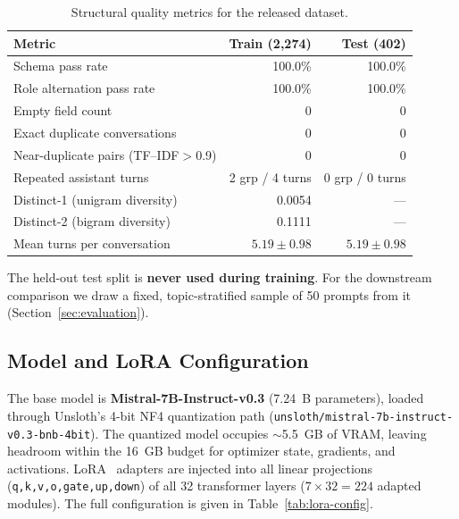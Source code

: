 \documentclass[11pt, a4paper]{article}
\begin{document}
\begin{table}[H]
\centering
\caption{Structural quality metrics for the released dataset.}
\label{tab:dataset-quality}
\begin{tabular}{lrr}
\hline
\textbf{Metric} & \textbf{Train (2{,}274)} & \textbf{Test (402)} \\
\hline
Schema pass rate                     & 100.0\% & 100.0\% \\
Role alternation pass rate           & 100.0\% & 100.0\% \\
Empty field count                    & 0       & 0       \\
Exact duplicate conversations        & 0       & 0       \\
Near-duplicate pairs (TF--IDF$>$0.9) & 0       & 0       \\
Repeated assistant turns             & 2 grp / 4 turns & 0 grp / 0 turns \\
Distinct-1 (unigram diversity)       & 0.0054  & ---     \\
Distinct-2 (bigram diversity)        & 0.1111  & ---     \\
Mean turns per conversation          & $5.19 \pm 0.98$ & $5.19 \pm 0.98$ \\
\hline
\end{tabular}
\end{table}

The held-out test split is \textbf{never used during training}. For the downstream comparison we draw a fixed, topic-stratified sample of 50 prompts from it (Section~\ref{sec:evaluation}).

\subsection{Model and LoRA Configuration}
The base model is \textbf{Mistral-7B-Instruct-v0.3} (7.24~B parameters), loaded through Unsloth's 4-bit NF4 quantization path (\texttt{unsloth/mistral-7b-instruct-v0.3-bnb-4bit}). The quantized model occupies $\sim$5.5~GB of VRAM, leaving headroom within the 16~GB budget for optimizer state, gradients, and activations. LoRA~\cite{hu2021} adapters are injected into all linear projections (\texttt{q,k,v,o,gate,up,down}) of all 32 transformer layers ($7 \times 32 = 224$ adapted modules). The full configuration is given in Table~\ref{tab:lora-config}.
\end{document}

